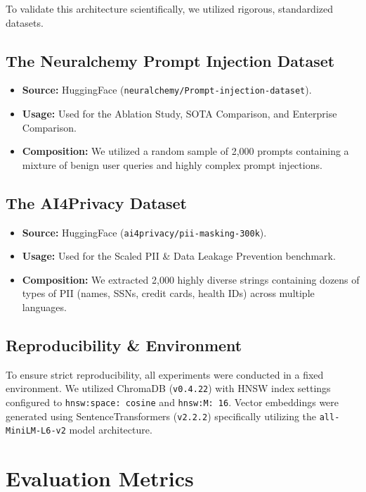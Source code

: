 \documentclass[12pt,a4paper]{article}
\begin{document}
To validate this architecture scientifically, we utilized rigorous, standardized datasets.

\subsection{The Neuralchemy Prompt Injection Dataset}
\begin{itemize}
    \item \textbf{Source:} HuggingFace (\texttt{neuralchemy/Prompt-injection-dataset}).
    \item \textbf{Usage:} Used for the Ablation Study, SOTA Comparison, and Enterprise Comparison.
    \item \textbf{Composition:} We utilized a random sample of 2,000 prompts containing a mixture of benign user queries and highly complex prompt injections.
\end{itemize}

\subsection{The AI4Privacy Dataset}
\begin{itemize}
    \item \textbf{Source:} HuggingFace (\texttt{ai4privacy/pii-masking-300k}).
    \item \textbf{Usage:} Used for the Scaled PII \& Data Leakage Prevention benchmark.
    \item \textbf{Composition:} We extracted 2,000 highly diverse strings containing dozens of types of PII (names, SSNs, credit cards, health IDs) across multiple languages.
\end{itemize}



\subsection{Reproducibility \& Environment}
To ensure strict reproducibility, all experiments were conducted in a fixed environment. We utilized ChromaDB (\texttt{v0.4.22}) with HNSW index settings configured to \texttt{hnsw:space: cosine} and \texttt{hnsw:M: 16}. Vector embeddings were generated using SentenceTransformers (\texttt{v2.2.2}) specifically utilizing the \texttt{all-MiniLM-L6-v2} model architecture.

\section{Evaluation Metrics}
\end{document}
